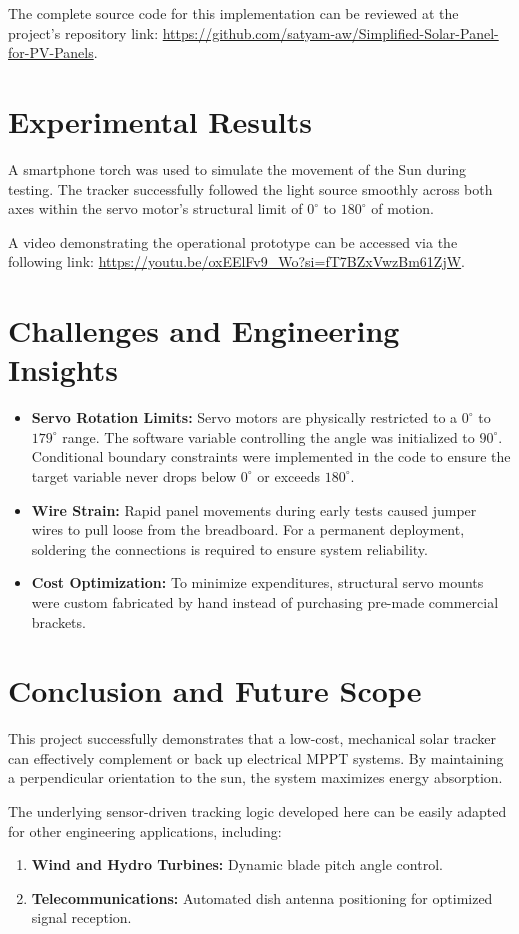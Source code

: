 \documentclass[11pt,a4paper]{article}
\begin{document}
\noindent The complete source code for this implementation can be reviewed at the project's repository link: \url{https://github.com/satyam-aw/Simplified-Solar-Panel-for-PV-Panels}.

\section{Experimental Results}
A smartphone torch was used to simulate the movement of the Sun during testing. The tracker successfully followed the light source smoothly across both axes within the servo motor's structural limit of $0^\circ$ to $180^\circ$ of motion. 

\noindent A video demonstrating the operational prototype can be accessed via the following link: \url{https://youtu.be/oxEElFv9_Wo?si=fT7BZxVwzBm61ZjW}.

\section{Challenges and Engineering Insights}
\begin{itemize}
    \item \textbf{Servo Rotation Limits:} Servo motors are physically restricted to a $0^\circ$ to $179^\circ$ range. The software variable controlling the angle was initialized to $90^\circ$. Conditional boundary constraints were implemented in the code to ensure the target variable never drops below $0^\circ$ or exceeds $180^\circ$.
    \item \textbf{Wire Strain:} Rapid panel movements during early tests caused jumper wires to pull loose from the breadboard. For a permanent deployment, soldering the connections is required to ensure system reliability.
    \item \textbf{Cost Optimization:} To minimize expenditures, structural servo mounts were custom fabricated by hand instead of purchasing pre-made commercial brackets.
\end{itemize}

\section{Conclusion and Future Scope}
This project successfully demonstrates that a low-cost, mechanical solar tracker can effectively complement or back up electrical MPPT systems. By maintaining a perpendicular orientation to the sun, the system maximizes energy absorption. 

The underlying sensor-driven tracking logic developed here can be easily adapted for other engineering applications, including:
\begin{enumerate}
    \item \textbf{Wind and Hydro Turbines:} Dynamic blade pitch angle control.
    \item \textbf{Telecommunications:} Automated dish antenna positioning for optimized signal reception.
\end{enumerate}
\end{document}
